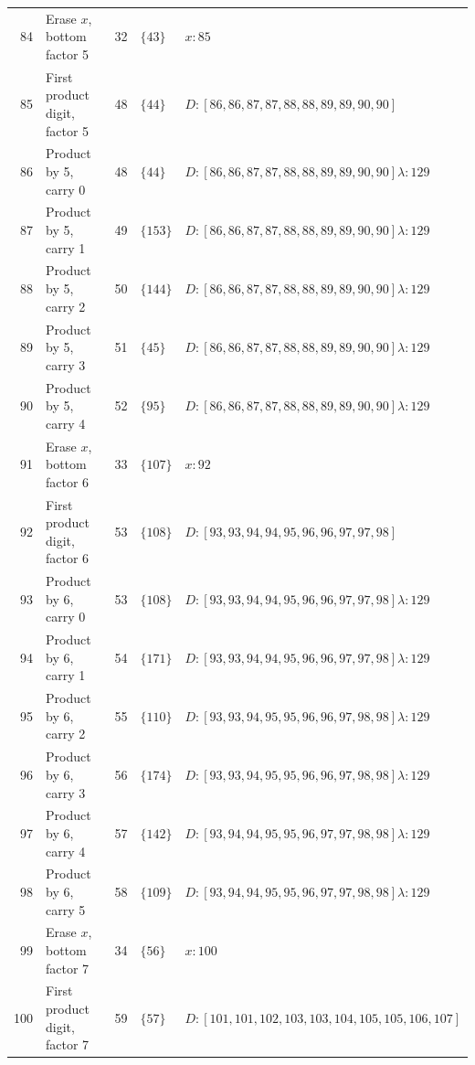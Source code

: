 \documentclass[11pt,a4paper]{article}
\newcommand{\blank}{\lambda}
\begin{document}
\begin{longtable}{r p{4.0cm} r l p{8.1cm}}
84 & Erase $x$, bottom factor 5 & 32 & $\{43\}$ & $x:85$ \\
85 & First product digit, factor 5 & 48 & $\{44\}$ & $D:[86,86,87,87,88,88,89,89,90,90]$ \\
86 & Product by 5, carry 0 & 48 & $\{44\}$ & $D:[86,86,87,87,88,88,89,89,90,90]$\newline$\blank:129$ \\
87 & Product by 5, carry 1 & 49 & $\{153\}$ & $D:[86,86,87,87,88,88,89,89,90,90]$\newline$\blank:129$ \\
88 & Product by 5, carry 2 & 50 & $\{144\}$ & $D:[86,86,87,87,88,88,89,89,90,90]$\newline$\blank:129$ \\
89 & Product by 5, carry 3 & 51 & $\{45\}$ & $D:[86,86,87,87,88,88,89,89,90,90]$\newline$\blank:129$ \\
90 & Product by 5, carry 4 & 52 & $\{95\}$ & $D:[86,86,87,87,88,88,89,89,90,90]$\newline$\blank:129$ \\
91 & Erase $x$, bottom factor 6 & 33 & $\{107\}$ & $x:92$ \\
92 & First product digit, factor 6 & 53 & $\{108\}$ & $D:[93,93,94,94,95,96,96,97,97,98]$ \\
93 & Product by 6, carry 0 & 53 & $\{108\}$ & $D:[93,93,94,94,95,96,96,97,97,98]$\newline$\blank:129$ \\
94 & Product by 6, carry 1 & 54 & $\{171\}$ & $D:[93,93,94,94,95,96,96,97,97,98]$\newline$\blank:129$ \\
95 & Product by 6, carry 2 & 55 & $\{110\}$ & $D:[93,93,94,95,95,96,96,97,98,98]$\newline$\blank:129$ \\
96 & Product by 6, carry 3 & 56 & $\{174\}$ & $D:[93,93,94,95,95,96,96,97,98,98]$\newline$\blank:129$ \\
97 & Product by 6, carry 4 & 57 & $\{142\}$ & $D:[93,94,94,95,95,96,97,97,98,98]$\newline$\blank:129$ \\
98 & Product by 6, carry 5 & 58 & $\{109\}$ & $D:[93,94,94,95,95,96,97,97,98,98]$\newline$\blank:129$ \\
99 & Erase $x$, bottom factor 7 & 34 & $\{56\}$ & $x:100$ \\
100 & First product digit, factor 7 & 59 & $\{57\}$ & $D:[101,101,102,103,103,104,105,105,106,107]$ \\

\end{longtable}
\end{document}
